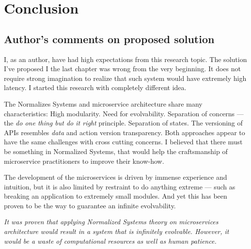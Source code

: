 \documentclass[thesis=M,english,hidelinks]{FITthesis}[2012/10/20]
\begin{document}
% 
% 
\chapter{Conclusion}
\label{sec:conclusion}
\section{Author's comments on proposed solution}
I, as an author, have had high expectations from this research topic. The solution I've proposed I the last chapter was wrong from the very beginning. It does not require strong imagination to realize that such system would have extremely high latency. I started this research with completely different idea.

The Normalizes Systems and microservice architecture share many characteristics: High modularity. Need for evolvability. Separation of concerns --- the \textit{do one thing but do it right} principle. Separation of states. The versioning of APIs resembles \textit{data} and {action version transparency}. Both approaches appear to have the same challenges with cross cutting concerns. I believed that there must be something in Normalized Systems, that would help the craftsmanship of microservice practitioners to improve their know-how.

The development of the microservices is driven by immense experience and intuition, but it is also limited by restraint to do anything extreme --- such as breaking an application to extremely small modules. And yet this has been proven to be the way to guarantee an infinite evolvability.

\begin{center}
\textit{It was proven that applying Normalized Systems theory on microservices architecture would result in a system that is infinitely evolvable. However, it would be a waste of computational resources as well as human patience.}
\end{center}

\break
\end{document}
